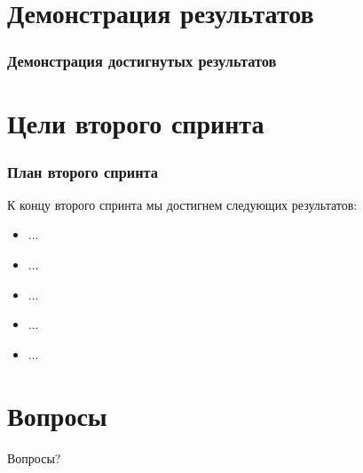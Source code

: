 \documentclass{beamer}
\newlength{\wideitemsep}
\let\olditem\item
\renewcommand{\item}{\setlength{\itemsep}{\wideitemsep}\olditem}
\begin{document}
\section{Демонстрация результатов}

\begin{frame}
\frametitle{Демонстрация достигнутых результатов}



\end{frame}

\section{Цели второго спринта}

\begin{frame}
\frametitle{План второго спринта}

К концу второго спринта мы достигнем следующих результатов:
\medskip
\begin{itemize}
\item ...
\item ...
\item ...
\item ...
\item ...
\end{itemize}

\end{frame}

\section{Вопросы}

\begin{frame}
\Huge{\centerline{Вопросы?}}
\end{frame}

\end{document}
